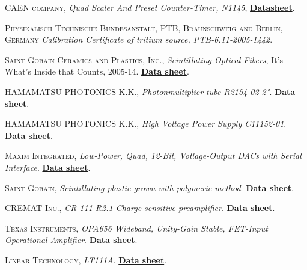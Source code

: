 \begin{thebibliography}{100}
 \textsc{CAEN company},
\textit{Quad Scaler And Preset Counter-Timer, N1145}, \href{https://www.caen.it/products/n1145/}{\textbf{Datasheet}}.

 \textsc{Physikalisch-Technische Bundesanstalt, PTB, Braunschweig and Berlin, Germany}
\textit{Calibration Certificate of tritium source, PTB-6.11-2005-1442}.

 \textsc{Saint-Gobain Ceramics and Plastics, Inc.},
\textit{Scintillating Optical Fibers}, It's What's Inside that Counts, 2005-14. \href{https://www.crystals.saint-gobain.com/products/scintillating-fiber}{\textbf{Data sheet}}. 

 \textsc{HAMAMATSU PHOTONICS K.K.},
\textit{Photonmultiplier tube R2154-02 2"}. \href{https://www.hamamatsu.com/eu/en/product/type/R2154-02/index.html}{\textbf{Data sheet}}.

 \textsc{HAMAMATSU PHOTONICS K.K.},
\textit{High Voltage Power Supply C11152-01}. \href{https://www.hamamatsu.com/jp/en/product/type/C11152-01/index.html}{\textbf{Data sheet}}.

 \textsc{Maxim Integrated},
\textit{Low-Power, Quad, 12-Bit, Votlage-Output DACs with Serial Interface}. \href{https://www.maximintegrated.com/en/products/analog/data-converters/digital-to-analog-converters/MAX5500.html}{\textbf{Data sheet}}.

 \textsc{Saint-Gobain},
\textit{Scintillating plastic grown with polymeric method}. \href{https://www.epic-crystal.com/others/plastic-scintillator.html}{\textbf{Data sheet}}.

 \textsc{CREMAT Inc.},
\textit{CR 111-R2.1 Charge sensitive preamplifier}. \href{https://www.cremat.com/home/charge-sensitive-preamplifiers/}{\textbf{Data sheet}}.

 \textsc{Texas Instruments},
\textit{OPA656 Wideband, Unity-Gain Stable, FET-Input Operational Amplifier}. \href{https://www.ti.com/product/OPA656}{\textbf{Data sheet}}.

 \textsc{Linear Technology},
\textit{LT111A}. \href{https://datasheetspdf.com/pdf/57354/LinearTechnology/LT111/1}{\textbf{Data sheet}}.


\end{thebibliography}
